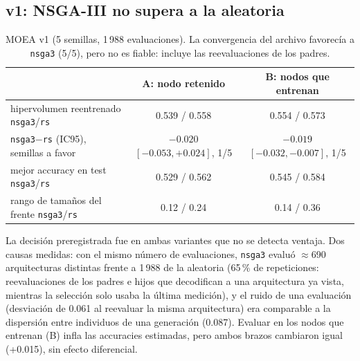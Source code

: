\documentclass[11pt,a4paper]{article}
\begin{document}
\subsection*{v1: NSGA-III no supera a la aleatoria}
\begin{table}[h]
\centering\small
\begin{tabular}{lcc}
\toprule
 & A: nodo retenido & B: nodos que entrenan\\
\midrule
hipervolumen reentrenado \texttt{nsga3}/\texttt{rs} & 0.539 / 0.558 & 0.554 / 0.573\\
\texttt{nsga3}$-$\texttt{rs} (IC95), semillas a favor & $-0.020$ $[-0.053,+0.024]$, 1/5 & $-0.019$ $[-0.032,-0.007]$, 1/5\\
mejor accuracy en test \texttt{nsga3}/\texttt{rs} & 0.529 / 0.562 & 0.545 / 0.584\\
rango de tamaños del frente \texttt{nsga3}/\texttt{rs} & 0.12 / 0.24 & 0.14 / 0.36\\
\bottomrule
\end{tabular}
\caption{MOEA v1 (5 semillas, 1\,988 evaluaciones). La convergencia del archivo favorecía a \texttt{nsga3} (5/5), pero no es fiable: incluye las reevaluaciones de los padres.}
\label{tab:moea1}
\end{table}

La decisión preregistrada fue en ambas variantes que no se detecta ventaja. Dos causas medidas: con el mismo número de evaluaciones, \texttt{nsga3} evaluó $\approx$690 arquitecturas distintas frente a 1\,988 de la aleatoria (65\,\% de repeticiones: reevaluaciones de los padres e hijos que decodifican a una arquitectura ya vista, mientras la selección solo usaba la última medición), y el ruido de una evaluación (desviación de 0.061 al reevaluar la misma arquitectura) era comparable a la dispersión entre individuos de una generación (0.087). Evaluar en los nodos que entrenan (B) infla las accuracies estimadas, pero ambos brazos cambiaron igual (+0.015), sin efecto diferencial.
\end{document}
